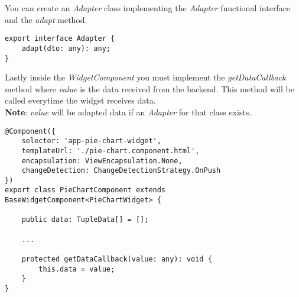 You can create an \textit{Adapter} class implementing the \textit{Adapter} functional interface and the \textit{adapt} method.
\begin{lstlisting}[caption={Adapter interface}, style=javaScriptCode]
export interface Adapter {
    adapt(dto: any): any;
}
\end{lstlisting}
Lastly inside the \textit{WidgetComponent} you must implement the \textit{getDataCallback} method where \textit{value} is the data received from the backend.  This method will be called everytime the widget receives data.\\
\textbf{Note}: \textit{value} will be adapted data if an \textit{Adapter} for that class exists.
\begin{lstlisting}[caption={PieChartComponent example}, style=javaScriptCode]
@Component({
    selector: 'app-pie-chart-widget',
    templateUrl: './pie-chart.component.html',
    encapsulation: ViewEncapsulation.None,
    changeDetection: ChangeDetectionStrategy.OnPush
})
export class PieChartComponent extends BaseWidgetComponent<PieChartWidget> {

    public data: TupleData[] = [];
  
    ...

    protected getDataCallback(value: any): void {
        this.data = value;
    }
}
\end{lstlisting}

